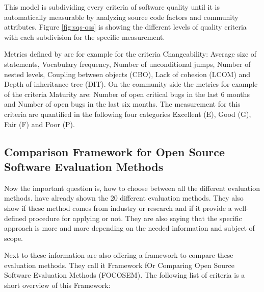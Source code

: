 \documentclass[DIV=calc,paper=a4,fontsize=9pt,twocolumn]{scrartcl}
\begin{document}
This model is subdividing every criteria of software quality until it is automatically measurable by analyzing source code factors and community attributes. Figure \ref{fig:sqs-oss} is showing the different levels of quality criteria with each subdivision for the specific measurement. 

Metrics defined by \citet{samoladas2008sqo} are for example for the criteria Changeability: Average size of statements, Vocabulary frequency, Number of unconditional jumps, Number of nested levels, Coupling between objects (CBO), Lack of cohesion (LCOM) and Depth of inheritance tree (DIT). On the community side the metrics for example of the criteria Maturity are: Number of open critical bugs in the last 6 months and Number of open bugs in the last six months. The measurement for this criteria are quantified in the following four categories Excellent (E), Good (G), Fair (F) and Poor (P). \citep{samoladas2008sqo}


\subsection{Comparison Framework for Open Source Software Evaluation Methods}

Now the important question is, how to choose between all the different evaluation methods. \citet{stol2010comparison} have already shown the 20 different evaluation methods. They also show if these method comes from industry or research and if it provide a well-defined procedure for applying or not. They are also saying that the specific approach is more and more depending on the needed information and subject of scope. 

Next to these information \citet{stol2010comparison} are also offering a framework to compare these evaluation methods. They call it Framework fOr Comparing Open Source Software Evaluation Methods (FOCOSEM). The following list of criteria is a short overview of this Framework:
\end{document}
